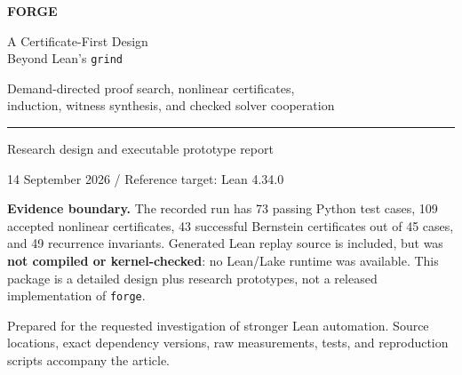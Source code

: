 \documentclass[11pt,a4paper]{article}
\newcommand{\grind}{\texttt{grind}}
\newcommand{\forge}{\texttt{forge}}
\begin{document}
\begin{titlepage}
\vspace*{14mm}
{\sffamily\bfseries\color{ForgeBlue}\fontsize{42}{46}\selectfont FORGE\par}
\vspace{5mm}
{\sffamily\LARGE A Certificate-First Design\\[2mm]Beyond Lean's \texttt{grind}\par}
\vspace{8mm}
{\large Demand-directed proof search, nonlinear certificates,\\
induction, witness synthesis, and checked solver cooperation\par}
\vspace{10mm}
\textcolor{ForgeBlue}{\rule{\textwidth}{0.7pt}}
\vspace{3mm}
{\sffamily\large Research design and executable prototype report\par}
{14 September 2026 \quad / \quad Reference target: Lean 4.34.0\par}
\vspace{7mm}
\begin{abstract}
\noindent
A tactic substantially broader than \grind\ should not replace its congruence
closure with another e-graph, nor merely run a longer list of existing tactics.
It should retain \grind\ as a strong local engine while discovering the missing
intermediate facts, structural arguments, witnesses, and nonlinear certificates
that make local reasoning succeed. This report specifies \emph{Forge}, a typed,
scope-aware, certificate-first architecture for that purpose. Four research
prototypes are implemented and tested: demand-directed Horn inference, sparse
polynomial-cone search, Bernstein positivity certificates, and polynomial
recurrence invariants. They demonstrate concrete mechanisms, including their
failure modes, but do not establish superiority over the actual Lean tactic.
The proposed Lean integration has not been implemented or benchmarked.
\end{abstract}
\vspace{5mm}
\begin{statusbox}
\textbf{Evidence boundary.} The recorded run has 73 passing Python test cases,
109 accepted nonlinear certificates, 43 successful Bernstein certificates out
of 45 cases, and 49 recurrence invariants. Generated Lean replay source is
included, but was \textbf{not compiled or kernel-checked}: no Lean/Lake runtime
was available. This package is a detailed design plus research prototypes,
not a released implementation of \forge.
\end{statusbox}
\vfill
{\small Prepared for the requested investigation of stronger Lean automation.
Source locations, exact dependency versions, raw measurements, tests, and
reproduction scripts accompany the article.}
\end{titlepage}
\setcounter{page}{2}
{\setlength{\parskip}{0pt}\small\tableofcontents}
\clearpage
\end{document}
